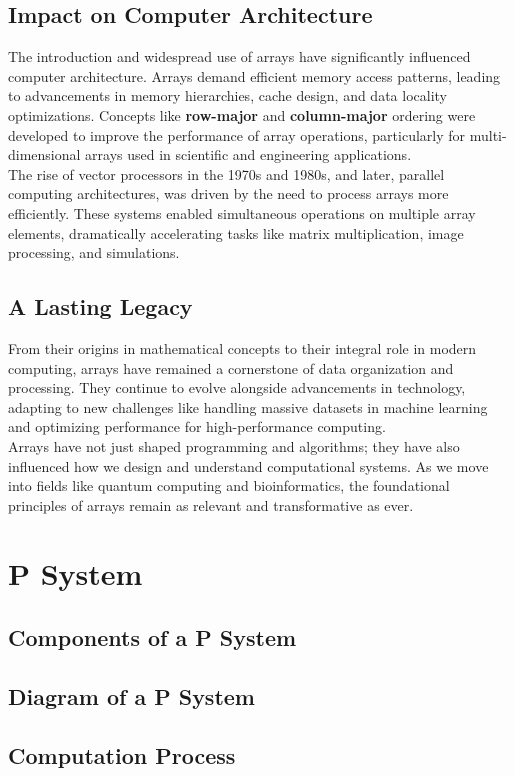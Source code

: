 \documentclass[12pt, oneside]{book}
\begin{document}
\subsection{Impact on Computer Architecture}
The introduction and widespread use of arrays have significantly influenced computer architecture. Arrays demand efficient memory access patterns, leading to advancements in memory hierarchies, cache design, and data locality optimizations. Concepts like \textbf{row-major} and \textbf{column-major} ordering were developed to improve the performance of array operations, particularly for multi-dimensional arrays used in scientific and engineering applications.\\
The rise of vector processors in the 1970s and 1980s, and later, parallel computing architectures, was driven by the need to process arrays more efficiently. These systems enabled simultaneous operations on multiple array elements, dramatically accelerating tasks like matrix multiplication, image processing, and simulations.\\
\subsection{A Lasting Legacy}
From their origins in mathematical concepts to their integral role in modern computing, arrays have remained a cornerstone of data organization and processing. They continue to evolve alongside advancements in technology, adapting to new challenges like handling massive datasets in machine learning and optimizing performance for high-performance computing.\\
Arrays have not just shaped programming and algorithms; they have also influenced how we design and understand computational systems. As we move into fields like quantum computing and bioinformatics, the foundational principles of arrays remain as relevant and transformative as ever.
\section{P System}
\subsection{Components of a P System}
\subsection{Diagram of a P System}
\subsection{Computation Process}
\end{document}
